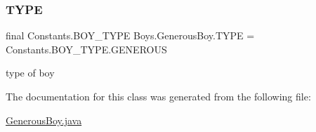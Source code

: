 \subsubsection{\texorpdfstring{T\+Y\+PE}{TYPE}}
{\footnotesize\ttfamily final Constants.\+B\+O\+Y\+\_\+\+T\+Y\+PE Boys.\+Generous\+Boy.\+T\+Y\+PE = Constants.\+B\+O\+Y\+\_\+\+T\+Y\+P\+E.\+G\+E\+N\+E\+R\+O\+US}

type of boy 

The documentation for this class was generated from the following file\+:\begin{DoxyCompactItemize}
\item 
\hyperlink{_generous_boy_8java}{Generous\+Boy.\+java}\end{DoxyCompactItemize}
